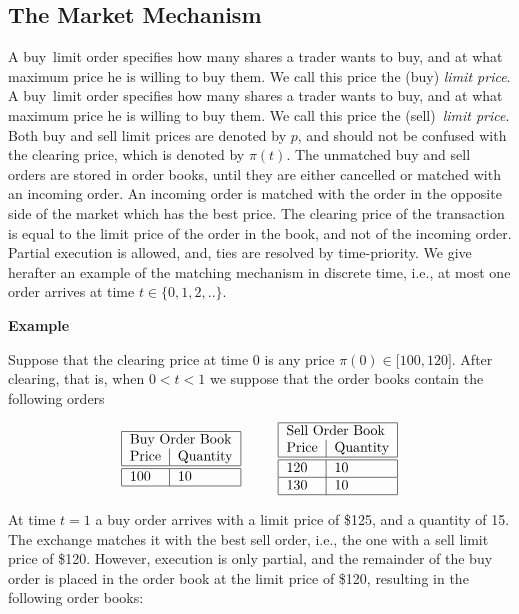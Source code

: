 \documentclass{article}
\begin{document}
\subsection{The Market Mechanism}

\noindent A buy\ limit order specifies how many shares a trader wants to
buy, and at what maximum price he is willing to buy them. We call this price
the (buy) \textit{limit price}. A buy\ limit order specifies how many shares
a trader wants to buy, and at what maximum price he is willing to buy them.
We call this price the (sell)\ \textit{limit price}. Both buy and sell limit
prices are denoted by $p$, and should not be confused with the clearing
price, which is denoted by $\pi (t)$. The unmatched buy and sell orders are
stored in order books, until they are either cancelled or matched with an
incoming order. An incoming order is matched with the order in the opposite
side of the market which has the best price. The clearing price of the
transaction is equal to the limit price of the order in the book, and not of
the incoming order. Partial execution is allowed, and, ties are resolved by
time-priority. We give herafter an example of the matching mechanism in
discrete time, i.e., at most one order arrives at time $t\in \{0,1,2,..\}.$

\textbf{Example}

Suppose that the clearing price at time $0$ is any price $\pi (0)\in \lbrack
100,120]$. After clearing, that is, when $0<t<1$ we suppose that the order
books contain the following orders

\begin{equation*}
\begin{tabular}{|l|l|}
\hline
\multicolumn{2}{|l|}{Buy Order Book} \\ 
Price & Quantity \\ \hline\hline
100 & 10 \\ \hline
\end{tabular}%
\text{ \ \ \ \ \ }%
\begin{tabular}{|l|l|}
\hline
\multicolumn{2}{|l|}{Sell Order Book} \\ 
Price & Quantity \\ \hline\hline
120 & 10 \\ \hline
130 & 10 \\ \hline
\end{tabular}%
\end{equation*}

At time $t=1$ a buy order arrives with a limit price of \$125, and a
quantity of 15. The exchange matches it with the best sell order, i.e., the
one with a sell limit price of \$120. However, execution is only partial,
and the remainder of the buy order is placed in the order book at the limit
price of \$120, resulting in the following order books:
\end{document}
